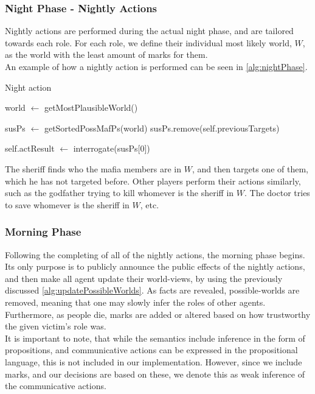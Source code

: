 \subsubsection{Night Phase - Nightly
	Actions}\label{sec:nightPhaseNightlyActions}
Nightly actions are performed during the actual night phase, and are tailored
towards each role. For each role, we define their individual most likely world,
$W$, as the world with the least amount of marks for them. \\ An example of how
a nightly action is performed can be seen in \cref{alg:nightPhase}.
\begin{algorithm}[H]
	\caption{Night action}
	\begin{algorithmic}[1]
		\State world $\gets$ getMostPlausibleWorld()

		\State susPs $\gets$ getSortedPossMafPs(world)
		\State susPs.remove(self.previousTargets)

		\State self.actResult $\gets$ interrogate(susPs[0])
		\EndIf
		\EndFunction

		\Statex
	\end{algorithmic}\label{alg:nightPhase}
\end{algorithm}
\setcounter{algorithmcaption}{7}
The sheriff finds who the mafia members are in $W$, and then targets one of
them, which he has not targeted before. Other players perform their actions
similarly, such as the godfather trying to kill whomever is the sheriff in $W$.
The doctor tries to save whomever is the sheriff in $W$, etc.

\subsubsection{Morning Phase}\label{sec:morningPhase}
Following the completing of all of the nightly actions, the morning phase
begins. Its only purpose is to publicly announce the public effects of the
nightly actions, and then make all agent update their world-views, by using the
previously discussed \cref{alg:updatePossibleWorlds}. As facts are revealed,
possible-worlds are removed, meaning that one may slowly infer the roles of
other agents. Furthermore, as people die, marks are added or altered based on
how trustworthy the given victim's role was. \\ It is important to note, that
while the semantics include inference in the form of propositions, and
communicative actions can be expressed in the propositional language, this is
not included in our implementation. However, since we include marks, and our
decisions are based on these, we denote this as weak inference of the
communicative actions.

